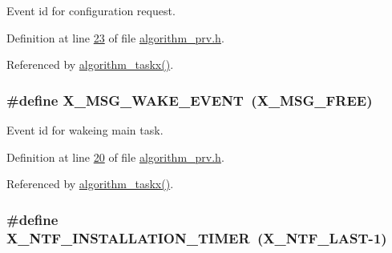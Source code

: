 Event id for configuration request. 



Definition at line \hyperlink{a00016_source_l00023}{23} of file \hyperlink{a00016_source}{algorithm\+\_\+prv.\+h}.



Referenced by \hyperlink{a00038_source_l01905}{algorithm\+\_\+taskx()}.

\hypertarget{a00016_ae6be514b1d949dc71420a3e549772995}{
\subsubsection[{X\+\_\+\+M\+S\+G\+\_\+\+W\+A\+K\+E\+\_\+\+E\+V\+E\+N\+T}]{\setlength{\rightskip}{0pt plus 5cm}\#define X\+\_\+\+M\+S\+G\+\_\+\+W\+A\+K\+E\+\_\+\+E\+V\+E\+N\+T~({\bf X\+\_\+\+M\+S\+G\+\_\+\+F\+R\+E\+E})}}\label{a00016_ae6be514b1d949dc71420a3e549772995}


Event id for wakeing main task. 



Definition at line \hyperlink{a00016_source_l00020}{20} of file \hyperlink{a00016_source}{algorithm\+\_\+prv.\+h}.



Referenced by \hyperlink{a00038_source_l01905}{algorithm\+\_\+taskx()}.

\hypertarget{a00016_a3339ece3779a71354bcfaa90905b3a4a}{
\subsubsection[{X\+\_\+\+N\+T\+F\+\_\+\+I\+N\+S\+T\+A\+L\+L\+A\+T\+I\+O\+N\+\_\+\+T\+I\+M\+E\+R}]{\setlength{\rightskip}{0pt plus 5cm}\#define X\+\_\+\+N\+T\+F\+\_\+\+I\+N\+S\+T\+A\+L\+L\+A\+T\+I\+O\+N\+\_\+\+T\+I\+M\+E\+R~({\bf X\+\_\+\+N\+T\+F\+\_\+\+L\+A\+S\+T}-\/1)}}\label{a00016_a3339ece3779a71354bcfaa90905b3a4a}


